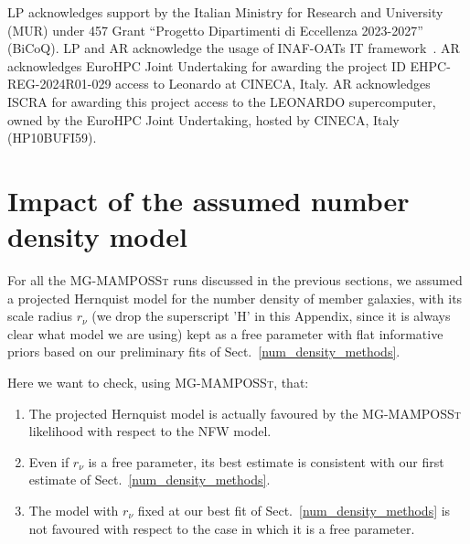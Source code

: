 \documentclass{aa}
\begin{document}
\begin{acknowledgements}
LP acknowledges support by the Italian Ministry for Research and University (MUR) under 457 Grant ``Progetto Dipartimenti di Eccellenza 2023-2027'' (BiCoQ).
LP and AR acknowledge the usage of INAF-OATs IT framework~\citep{Taffoni2020,Bertocco2020}.
AR acknowledges EuroHPC Joint Undertaking for awarding the project ID EHPC-REG-2024R01-029  access to Leonardo at CINECA, Italy.
AR acknowledges ISCRA for awarding this project access to the LEONARDO supercomputer, owned by the EuroHPC Joint Undertaking, hosted by CINECA, Italy (HP10BUFI59).
\end{acknowledgements}

\clearpage



\appendix
\section{Impact of the assumed number density model}
\label{app:A}

For all the \textsc{MG-MAMPOSSt} runs discussed in the previous sections, we assumed a projected Hernquist model for the number density of member galaxies, with its scale radius $r_\nu$ (we drop the superscript 'H' in this Appendix, since it is always clear what model we are using) kept as a free parameter with flat informative priors based on our preliminary fits of Sect.~\ref{num_density_methods}. 

Here we want to check, using \textsc{MG-MAMPOSSt}, that:
\begin{enumerate}
    \item[\textit{i)}] The projected Hernquist model is actually favoured by the \textsc{MG-MAMPOSSt} likelihood with respect to the NFW model.
    \item[\textit{ii)}] Even if $r_\nu$ is a free parameter, its best estimate is consistent with our first estimate of Sect.~\ref{num_density_methods}.
    \item[\textit{iii)}] The model with $r_\nu$ fixed at our best fit of Sect.~\ref{num_density_methods} is not favoured with respect to the case in which it is a free parameter.
\end{enumerate}
\end{document}
